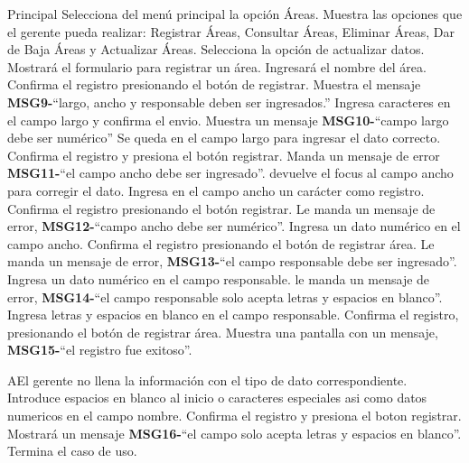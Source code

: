 	\begin{UCtrayectoria}{Principal}
		\UCpaso[\UCactor] Selecciona del menú principal la opción Áreas.
		\UCpaso Muestra las opciones que el gerente pueda realizar: Registrar Áreas, Consultar Áreas, Eliminar Áreas, Dar de Baja Áreas y Actualizar Áreas.
		\UCpaso[\UCactor] Selecciona la opción de actualizar datos.
		\UCpaso Mostrará el formulario para registrar un área.		
		\UCpaso[\UCactor] Ingresará el nombre del área.
		\UCpaso[\UCactor] Confirma el registro presionando el botón de registrar.
		\UCpaso Muestra el mensaje {\bf MSG9-}``largo, ancho y responsable deben ser ingresados.'' 	
		\UCpaso[\UCactor] Ingresa caracteres en el campo largo y confirma el envio.
		\UCpaso Muestra un mensaje {\bf MSG10-}``campo largo debe ser numérico''
		\UCpaso Se queda en el campo largo para ingresar el dato correcto.
		\UCpaso[\UCactor] Confirma el registro y presiona el botón registrar.
		\UCpaso Manda un mensaje de error {\bf MSG11-}``el campo ancho debe ser ingresado''.
		\UCpaso devuelve el focus al campo ancho para corregir el dato.
		\UCpaso[\UCactor] Ingresa en el campo ancho un carácter como registro.
		\UCpaso[\UCactor] Confirma el registro presionando el botón registrar.
		\UCpaso Le manda un mensaje de error, {\bf MSG12-}``campo ancho debe ser numérico''.
		\UCpaso[\UCactor] Ingresa un dato numérico en el campo ancho.
		\UCpaso[\UCactor] Confirma el registro presionando el botón  de registrar área.
		\UCpaso Le manda un mensaje de error, {\bf MSG13-}``el campo responsable debe ser ingresado''.
		\UCpaso[\UCactor] Ingresa un dato numérico en el campo responsable.
		\UCpaso le manda un mensaje de error, {\bf MSG14-}``el campo responsable solo acepta letras y espacios en blanco''. 
		\UCpaso[\UCactor] Ingresa letras y espacios en blanco en el campo responsable.
		\UCpaso[\UCactor] Confirma el registro, presionando el botón de registrar área.
		\UCpaso Muestra una pantalla con un mensaje, {\bf MSG15-}``el registro fue exitoso''.
	\end{UCtrayectoria}
		
		\begin{UCtrayectoriaA}{A}{El gerente no llena la información con el tipo de dato correspondiente.}
			\UCpaso[\UCactor] Introduce espacios en blanco al inicio o caracteres especiales asi como datos numericos en el campo nombre.
			\UCpaso[\UCactor] Confirma el registro y presiona el boton registrar.
			\UCpaso Mostrará un mensaje  {\bf MSG16-}``el campo solo acepta letras y espacios en blanco''.
			\UCpaso[] Termina el caso de uso.
		\end{UCtrayectoriaA}